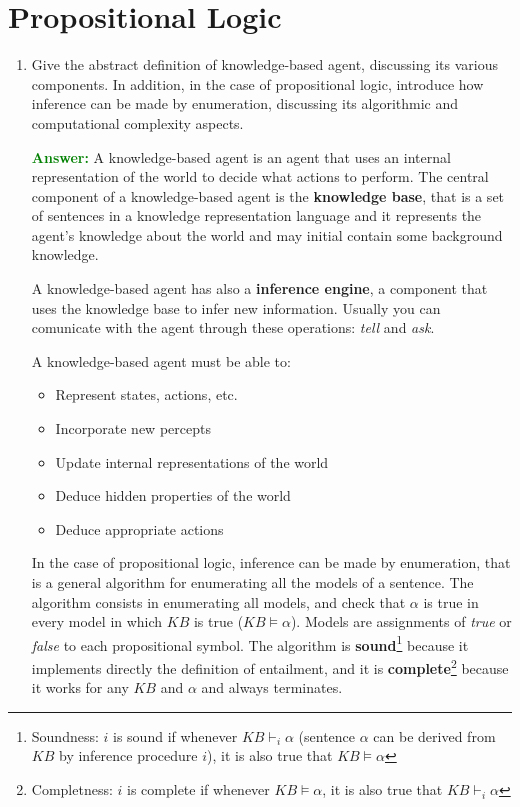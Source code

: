 \documentclass[12pt]{article}
\begin{document}
\section{Propositional Logic}
\begin{enumerate}[label=\textbf{PL.\arabic*}]
    \item Give the abstract definition of knowledge-based agent, discussing its various components. 
    In addition, in the case of propositional logic, introduce how inference can be made by enumeration, discussing its algorithmic and computational complexity aspects.
    
    \textcolor{green}{\textbf{Answer:}}
    A knowledge-based agent is an agent that uses an internal representation of the world to decide what actions to perform.
    The central component of a knowledge-based agent is the \textbf{knowledge base}, 
    that is a set of sentences in a knowledge representation language 
    and it represents the agent's knowledge about the world and may initial contain some background knowledge.

    A knowledge-based agent has also a \textbf{inference engine}, a component that uses the knowledge base to infer new information.
    Usually you can comunicate with the agent through these operations: \textit{tell} and \textit{ask}.

    A knowledge-based agent must be able to:
    \begin{itemize}
        \item Represent states, actions, etc.
        \item Incorporate new percepts
        \item Update internal representations of the world
        \item Deduce hidden properties of the world
        \item Deduce appropriate actions
    \end{itemize}

    In the case of propositional logic, inference can be made by enumeration, that is a general algorithm for enumerating all the models of a sentence.
    The algorithm consists in enumerating all models, and check that $\alpha$ is true in every model in which $KB$ is true ($KB\vDash \alpha$).
    Models are assignments of \textit{true} or \textit{false} to each propositional symbol.
    The algorithm is \textbf{sound}\footnote{Soundness: $i$ is sound if whenever $KB\vdash_i\alpha$ 
    (sentence $\alpha$ can be derived from $KB$ by inference procedure $i$), it is also true that $KB\vDash\alpha$ } because it implements directly the definition of entailment, 
    and it is \textbf{complete}\footnote{Completness: $i$ is complete if whenever $KB\vDash\alpha$, it is also true that $KB\vdash_i\alpha$} because it works for any $KB$ and $\alpha$ and always terminates.


\end{enumerate}
\end{document}
